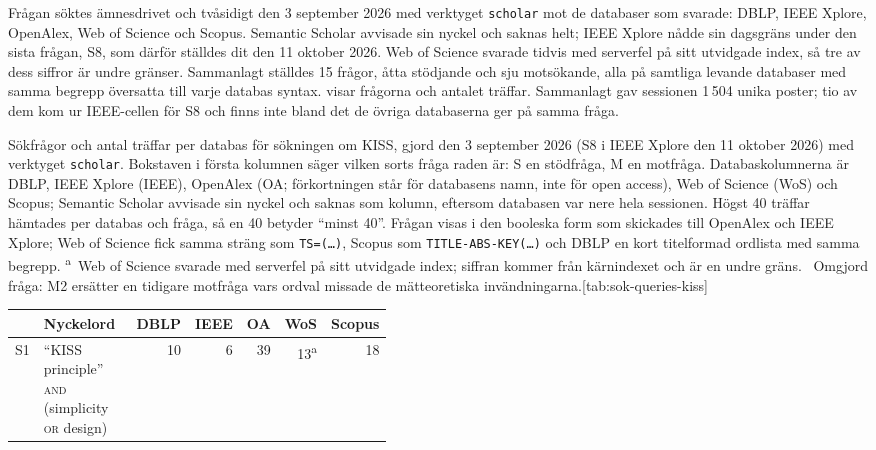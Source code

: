 Frågan söktes ämnesdrivet och tvåsidigt den 3 september 2026 med verktyget
\texttt{scholar} mot de databaser som svarade: DBLP, IEEE Xplore, OpenAlex,
Web of Science och Scopus.  Semantic Scholar avvisade sin nyckel och saknas
helt; IEEE Xplore nådde sin dagsgräns under den sista frågan, S8, som
därför ställdes dit den 11 oktober 2026.  Web of Science
svarade tidvis med serverfel på sitt utvidgade index, så tre av dess siffror
är undre gränser.  Sammanlagt ställdes 15 frågor, åtta stödjande och sju
motsökande, alla på samtliga levande databaser med samma begrepp översatta
till varje databas syntax.   visar frågorna och
antalet träffar.  Sammanlagt gav sessionen 1\,504 unika poster; tio av
dem kom ur IEEE-cellen för S8 och finns inte bland det de övriga
databaserna ger på samma fråga.

\begin{table}[htbp]
  \begin{sidecaption}{Sökfrågor och antal träffar per databas för
    sökningen om KISS, gjord den 3 september 2026 (S8 i IEEE Xplore den
    11 oktober 2026) med verktyget \texttt{scholar}.  Bokstaven i första kolumnen säger vilken sorts
    fråga raden är: S en stödfråga, M en motfråga.  Databaskolumnerna är
    DBLP, IEEE Xplore (IEEE), OpenAlex (OA; förkortningen står för
    databasens namn, inte för \foreignlanguage{english}{open access}),
    Web of Science (WoS) och Scopus; Semantic Scholar avvisade sin nyckel
    och saknas som kolumn, eftersom databasen var nere hela sessionen.
    Högst 40 träffar hämtades per databas och fråga, så en 40 betyder
    \enquote{minst 40}.  Frågan visas i den booleska form som skickades
    till OpenAlex och IEEE Xplore; Web of Science fick samma sträng som
    \texttt{TS=(\dots)}, Scopus som \texttt{TITLE-ABS-KEY(\dots)} och DBLP
    en kort titelformad ordlista med samma begrepp.
    \textsuperscript{a}~Web of Science svarade med serverfel på
    sitt utvidgade index; siffran kommer från kärnindexet och är en undre
    gräns.  \textsuperscript{\dag}~Omgjord fråga: M2 ersätter en
    tidigare motfråga vars ordval missade de mätteoretiska
    invändningarna.}[tab:sok-queries-kiss]
    \centering\footnotesize
    \begin{tabular}{@{}lp{0.44\linewidth}rrrrr@{}}
      \toprule
      & Nyckelord & DBLP & IEEE & OA & WoS & Scopus \\
      \midrule
      S1 & \enquote{KISS principle} \textsc{and} (simplicity \textsc{or} design)
         & 10 & 6 & 39 & 13\textsuperscript{a} & 18 \\

\end{tabular}
\end{sidecaption}
\end{table}
